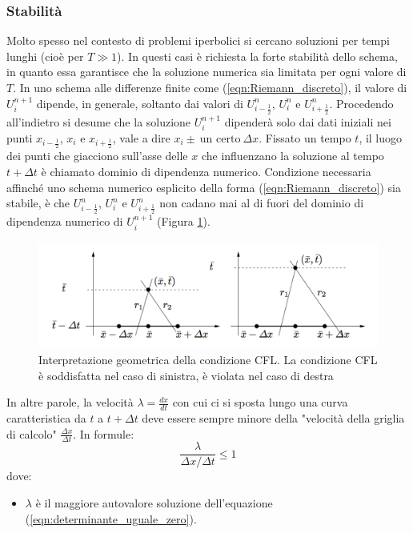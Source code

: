 \documentclass[12pt]{article} %
\begin{document}
\subsubsection{Stabilità}
\noindent Molto spesso nel contesto di problemi iperbolici si cercano soluzioni per tempi lunghi (cioè per $T\gg1$). In questi casi è richiesta la forte stabilità dello schema, in quanto essa garantisce che la soluzione numerica sia limitata per ogni valore di $T$. In uno schema alle differenze finite come (\ref{eqn:Riemann_discreto}), il valore di $U_i^{n+1}$ dipende, in generale, soltanto dai valori di $U^{n}_{i-\frac{1}{2}}$, $U^{n}_{i}$ e $U^{n}_{i+\frac{1}{2}}$. Procedendo all'indietro si desume che la soluzione $U_i^{n+1}$ dipenderà solo dai dati iniziali nei punti $x_{i-\frac{1}{2}}$, $x_i$ e $x_{i+\frac{1}{2}}$, vale a dire $x_i\pm\:\textrm{un certo}\:\Delta x$. Fissato un tempo $t$, il luogo dei punti che giacciono sull'asse delle $x$ che influenzano la soluzione al tempo $t+\Delta t$ è chiamato dominio di dipendenza numerico. Condizione necessaria affinché uno schema numerico esplicito della forma (\ref{eqn:Riemann_discreto}) sia stabile, è che $U^{n}_{i-\frac{1}{2}}$, $U^{n}_{i}$ e $U^{n}_{i+\frac{1}{2}}$ non cadano mai al di fuori del dominio di dipendenza numerico di $U_i^{n+1}$ (Figura \ref{fig:CFL}). 
\begin{figure}
    \centering
    \includegraphics[width=\textwidth]{CFL.png}
    \caption{Interpretazione geometrica della condizione CFL. La condizione CFL è soddisfatta nel caso di sinistra, è violata nel caso di destra}
    \label{fig:CFL}
\end{figure}
\noindent In altre parole, la velocità $\lambda=\frac{dx}{dt}$ con cui ci si sposta lungo una curva caratteristica da $t$ a $t+\Delta t$ deve essere sempre minore della "velocità della griglia di calcolo" $\frac{\Delta x}{\Delta t}$. In formule:
\begin{equation}
    \frac{\lambda}{\Delta x/\Delta t}\leq1
    \label{eqn:Courant}
\end{equation}
\noindent dove:
\begin{itemize}
    \item $\lambda$ è il maggiore autovalore soluzione dell'equazione (\ref{eqn:determinante_uguale_zero}).
\end{itemize}
\end{document}

